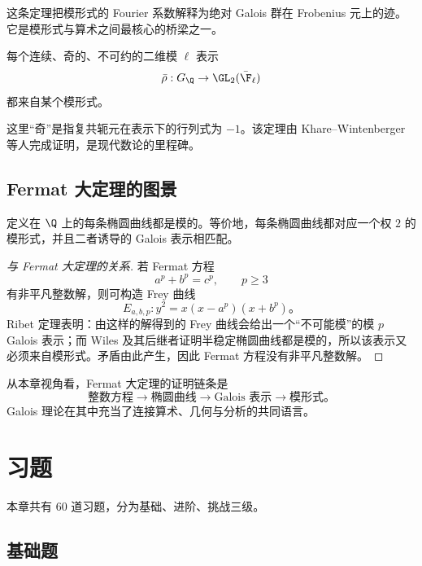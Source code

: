 \begin{remark}
这条定理把模形式的 Fourier 系数解释为绝对 Galois 群在 Frobenius 元上的迹。它是模形式与算术之间最核心的桥梁之一。
\end{remark}

\begin{theorem}
每个连续、奇的、不可约的二维模 $\ell$ 表示
\[
\bar\rho:G_{\Q}\to\GL_2(\bar{\F}_{\ell})
\]
都来自某个模形式。
\end{theorem}

\begin{remark}
这里“奇”是指复共轭元在表示下的行列式为 $-1$。该定理由 Khare--Wintenberger 等人完成证明，是现代数论的里程碑。
\end{remark}

\subsection*{Fermat 大定理的图景}

\begin{theorem}[模性定理，陈述]
定义在 $\Q$ 上的每条椭圆曲线都是模的。等价地，每条椭圆曲线都对应一个权 $2$ 的模形式，并且二者诱导的 Galois 表示相匹配。
\end{theorem}

\begin{proof}[与 Fermat 大定理的关系]
若 Fermat 方程
\[
a^p+b^p=c^p,
\qquad
p\ge3
\]
有非平凡整数解，则可构造 Frey 曲线
\[
E_{a,b,p}:y^2=x(x-a^p)(x+b^p)。
\]
Ribet 定理表明：由这样的解得到的 Frey 曲线会给出一个“不可能模”的模 $p$ Galois 表示；而 Wiles 及其后继者证明半稳定椭圆曲线都是模的，所以该表示又必须来自模形式。矛盾由此产生，因此 Fermat 方程没有非平凡整数解。
\end{proof}

\begin{remark}
从本章视角看，Fermat 大定理的证明链条是
\[
\text{整数方程}\to\text{椭圆曲线}\to\text{Galois 表示}\to\text{模形式}。
\]
Galois 理论在其中充当了连接算术、几何与分析的共同语言。
\end{remark}

\section*{习题}

本章共有 60 道习题，分为基础、进阶、挑战三级。

\subsection*{基础题}

